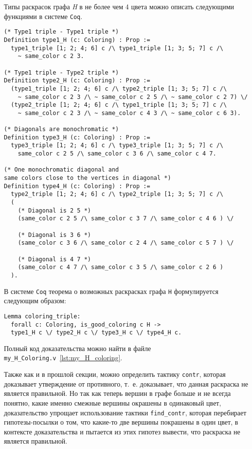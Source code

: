 Типы раскрасок графа {\it H} в не более чем 4 цвета можно описать следующими функциями в системе {\tt Coq}.

\begin{verbatim}
(* Type1 triple - Type1 triple *)
Definition type1_H (c: Coloring) : Prop :=
  type1_triple [1; 2; 4; 6] c /\ type1_triple [1; 3; 5; 7] c /\
    ~ same_color c 2 3.

(* Type1 triple - Type2 triple *)
Definition type2_H (c: Coloring) : Prop :=
  (type1_triple [1; 2; 4; 6] c /\ type2_triple [1; 3; 5; 7] c /\
    ~ same_color c 2 3 /\ ~ same_color c 2 5 /\ ~ same_color c 2 7) \/
  (type2_triple [1; 2; 4; 6] c /\ type1_triple [1; 3; 5; 7] c /\
    ~ same_color c 2 3 /\ ~ same_color c 4 3 /\ ~ same_color c 6 3).

(* Diagonals are monochromatic *)
Definition type3_H (c: Coloring) : Prop :=
  type3_triple [1; 2; 4; 6] c /\ type3_triple [1; 3; 5; 7] c /\
    same_color c 2 5 /\ same_color c 3 6 /\ same_color c 4 7.

(* One monochromatic diagonal and 
same colors close to the vertices in diagonal *)
Definition type4_H (c: Coloring) : Prop :=
  type2_triple [1; 2; 4; 6] c /\ type2_triple [1; 3; 5; 7] c /\
  (
    (* Diagonal is 2 5 *) 
    (same_color c 2 5 /\ same_color c 3 7 /\ same_color c 4 6 ) \/

    (* Diagonal is 3 6 *) 
    (same_color c 3 6 /\ same_color c 2 4 /\ same_color c 5 7 ) \/

    (* Diagonal is 4 7 *) 
    (same_color c 4 7 /\ same_color c 3 5 /\ same_color c 2 6 )
  ).
\end{verbatim}

В системе {\tt Coq} теорема о возможных раскрасках графа {\tt H} формулируется следующим образом:

\begin{verbatim}
Lemma coloring_triple:
  forall c: Coloring, is_good_coloring c H ->
  type1_H c \/ type2_H c \/ type3_H c \/ type4_H c.
\end{verbatim}

Полный код доказательства можно найти в файле {\tt my\_H\_Coloring.v}~\ref{lst:my_H_coloring}.

Также как и в прошлой секции, можно определить тактику {\tt contr}, которая доказывает утверждение от противного, т.~е. доказывает, что данная раскраска не является правильной. Но так как теперь вершин в графе больше и не всегда понятно, какие именно смежные вершины окрашены в одинаковый цвет, доказательство упрощает использование тактики {\tt find\_contr}, которая перебирает гипотезы-посылки о том, что какие-то две вершины покрашены в один цвет, в контексте доказательства и пытается из этих гипотез вывести, что раскраска не является правильной. 


